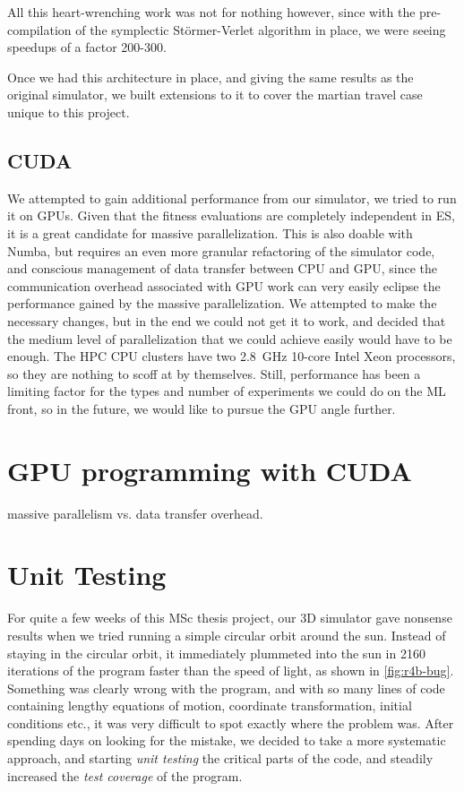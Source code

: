 All this heart-wrenching work was not for nothing however, since with the pre-compilation of the symplectic Störmer-Verlet algorithm in place, we were seeing speedups of a factor 200-300. 

Once we had this architecture in place, and giving the same results as the original simulator, we built extensions to it to cover the martian travel case unique to this project.

\subsection{CUDA}

We attempted to gain additional performance from our simulator, we tried to run it on GPUs. Given that the fitness evaluations are completely independent in ES, it is a great candidate for massive parallelization. This is also doable with Numba, but requires an even more granular refactoring of the simulator code, and conscious management of data transfer between CPU and GPU, since the communication overhead associated with GPU work can very easily eclipse the performance gained by the massive parallelization. We attempted to make the necessary changes, but in the end we could not get it to work, and decided that the medium level of parallelization that we could achieve easily would have to be enough. The HPC CPU clusters have two \SI{2.8}{\GHz} 10-core Intel Xeon processors, so they are nothing to scoff at by themselves. Still, performance has been a limiting factor for the types and number of experiments we could do on the ML front, so in the future, we would like to pursue the GPU angle further.

\section{GPU programming with CUDA}
massive parallelism vs. data transfer overhead.

\section{Unit Testing}
For quite a few weeks of this MSc thesis project, our 3D simulator gave nonsense results when we tried running a simple circular orbit around the sun. Instead of staying in the circular orbit, it immediately plummeted into the sun in 2160 iterations of the program faster than the speed of light, as shown in \cref{fig:r4b-bug}. Something was clearly wrong with the program, and with so many lines of code containing lengthy equations of motion, coordinate transformation, initial conditions etc., it was very difficult to spot exactly where the problem was. After spending days on looking for the mistake, we decided to take a more systematic approach, and starting \emph{unit testing} the critical parts of the code, and steadily increased the \emph{test coverage} of the program.

